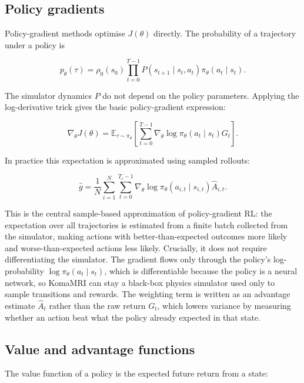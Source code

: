 \subsection{Policy gradients}
Policy-gradient methods optimise $J(\theta)$
directly.\cite{sutton_policy_gradient_1999,williams_reinforce_1992} The
probability of a trajectory under a policy is

\begin{equation}
p_\theta(\tau)
= \rho_0(s_0)
  \prod_{t=0}^{T-1}
  P(s_{t+1}\mid s_t,a_t)\pi_\theta(a_t\mid s_t).
\end{equation}

The simulator dynamics $P$ do not depend on the policy parameters. Applying the
log-derivative trick gives the basic policy-gradient expression:

\begin{equation}
\nabla_\theta J(\theta)
=
\mathbb{E}_{\tau \sim \pi_\theta}
\left[
    \sum_{t=0}^{T-1}
    \nabla_\theta \log \pi_\theta(a_t\mid s_t) G_t
\right].
\end{equation}

In practice this expectation is approximated using sampled rollouts:

\begin{equation}
\hat{g}
=
\frac{1}{N}
\sum_{i=1}^{N}
\sum_{t=0}^{T_i-1}
\nabla_\theta \log \pi_\theta(a_{i,t}\mid s_{i,t})
\hat{A}_{i,t}.
\end{equation}

This is the central sample-based approximation of policy-gradient RL: the
expectation over all trajectories is estimated from a finite batch collected
from the simulator, making actions with better-than-expected outcomes more
likely and worse-than-expected actions less likely. Crucially, it does not
require differentiating the simulator. The gradient flows only through the
policy's log-probability $\log \pi_\theta(a_t \mid s_t)$, which is
differentiable because the policy is a neural network, so KomaMRI can stay a
black-box physics simulator used only to sample transitions and rewards. The
weighting term is written as an advantage estimate $\hat{A}_t$ rather than the
raw return $G_t$, which lowers variance by measuring whether an action beat
what the policy already expected in that state.

\subsection{Value and advantage functions}
The value function of a policy is the expected future return from a state:

